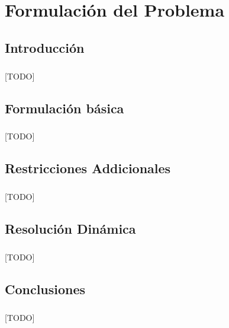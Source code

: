 \documentclass{subfiles}
\begin{document}
  \chapter{Formulación del Problema}
  \label{chap:formulation}

    \section{Introducción}
    \label{sec:formulation_introduction}

      \paragraph{}
      [TODO]

    \section{Formulación básica}
    \label{sec:formulation_basic_formulation}

      \paragraph{}
      [TODO]

    \section{Restricciones Addicionales}
    \label{sec:formulation_aditional_restrictions}

      \paragraph{}
      [TODO]

    \section{Resolución Dinámica}
    \label{sec:formulation_dynamic_solving}

      \paragraph{}
      [TODO]

    \section{Conclusiones}
    \label{sec:formulation_conclusions}

      \paragraph{}
      [TODO]
\end{document}
